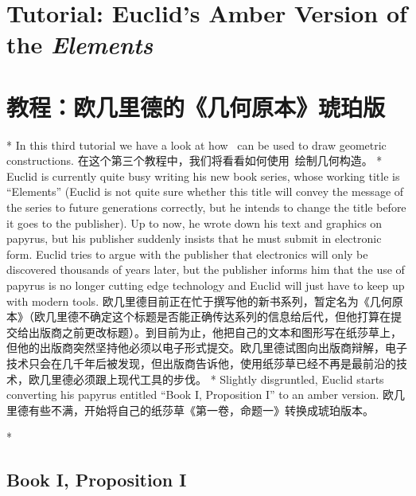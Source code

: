 %
%
%
\begin{paracol}{2}

\section{Tutorial: Euclid's Amber Version of the \emph{Elements}}
\switchcolumn
\section{教程：欧几里德的《几何原本》琥珀版}
\switchcolumn[0]*%
In this third tutorial we have a look at how \tikzname\ can be used to draw
geometric constructions.
\switchcolumn
在这个第三个教程中，我们将看看如何使用\tikzname\ 绘制几何构造。
\switchcolumn[0]*%
Euclid is currently quite busy writing his new book series, whose working title
is ``Elements'' (Euclid is not quite sure whether this title will convey the
message of the series to future generations correctly, but he intends to change
the title before it goes to the publisher). Up to now, he wrote down his text
and graphics on papyrus, but his publisher suddenly insists that he must submit
in electronic form. Euclid tries to argue with the publisher that electronics
will only be discovered thousands of years later, but the publisher informs him
that the use of papyrus is no longer cutting edge technology and Euclid will
just have to keep up with modern tools.
\switchcolumn
欧几里德目前正在忙于撰写他的新书系列，暂定名为《几何原本》（欧几里德不确定这个标题是否能正确传达系列的信息给后代，但他打算在提交给出版商之前更改标题）。到目前为止，他把自己的文本和图形写在纸莎草上，但他的出版商突然坚持他必须以电子形式提交。欧几里德试图向出版商辩解，电子技术只会在几千年后被发现，但出版商告诉他，使用纸莎草已经不再是最前沿的技术，欧几里德必须跟上现代工具的步伐。
\switchcolumn[0]*%
Slightly disgruntled, Euclid starts converting his papyrus entitled ``Book I,
Proposition I'' to an amber version.
\switchcolumn
欧几里德有些不满，开始将自己的纸莎草《第一卷，命题一》转换成琥珀版本。

\switchcolumn[0]*%
\subsection{Book I, Proposition I}
\switchcolumn

\end{paracol}
